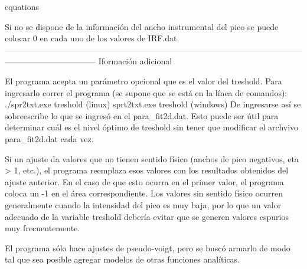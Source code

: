 equations

Si no se dispone de la información del ancho instrumental del pico se puede colocar 0 en cada uno de los valores de IRF.dat.
---------------------------------------------------------------------------------------------------------------------------------------------
Iformación adicional

El programa acepta un parámetro opcional que es el valor del treshold. Para ingresarlo correr el programa (se supone que se está en la línea de comandos):
./spr2txt.exe treshold (linux)
sprt2txt.exe treshold (windows)
De ingresarse así se sobreescribe lo que se ingresó en el para_fit2d.dat. Esto puede ser útil para determinar cuál es el nivel óptimo de treshold sin tener que modificar el archvivo para_fit2d.dat cada vez.

Si un ajuste da valores que no tienen sentido físico (anchos de pico negativos, eta > 1, etc.), el programa reemplaza esos valores con los resultados obtenidos del ajuste anterior. En el caso de que esto ocurra en el primer valor, el programa coloca un -1 en el área correspondiente.
Los valores sin sentido físico ocurren generalmente cuando la intensidad del pico es muy baja, por lo que un valor adecuado de la variable treshold debería evitar que se generen valores espurios muy frecuentemente.

El programa sólo hace ajustes de pseudo-voigt, pero se buscó armarlo de modo tal que sea posible agregar modelos de otras funciones analíticas.

